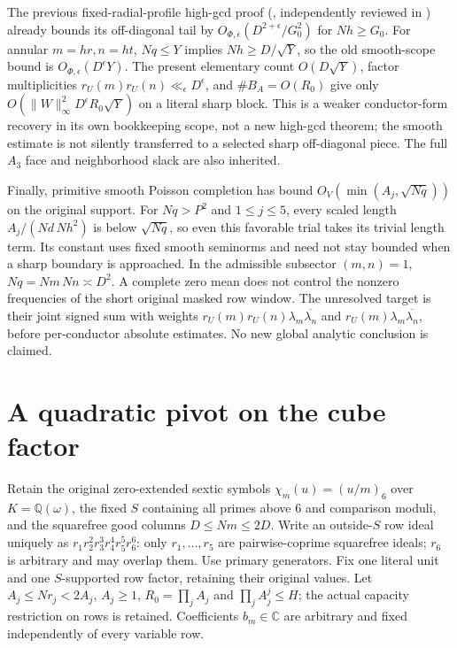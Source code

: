 \documentclass[11pt]{article}
\theoremstyle{definition}\newtheorem{definition}[theorem]{Definition}
\theoremstyle{remark}\newtheorem{remark}[theorem]{Remark}
\begin{document}
The previous fixed-radial-profile high-gcd proof
(, independently reviewed in
)
already bounds its off-diagonal tail by
$O_{\Phi,\epsilon}(D^{2+\epsilon}/G_0^2)$ for $Nh\ge G_0$.
For annular $m=hr,n=ht$, $Nq\le Y$ implies $Nh\ge D/\sqrt Y$,
so the old smooth-scope bound is $O_{\Phi,\epsilon}(D^\epsilon Y)$.
The present elementary count $O(D\sqrt Y)$, factor multiplicities
$r_U(m)r_U(n)\ll_\epsilon D^\epsilon$, and $\#B_A=O(R_0)$ give only
$O(\|W\|_\infty^2D^\epsilon R_0\sqrt Y)$ on a literal sharp block.
This is a weaker conductor-form recovery in its own bookkeeping scope,
not a new high-gcd theorem; the smooth estimate is not silently
transferred to a selected sharp off-diagonal piece.
The full $A_3$ face and neighborhood slack are also inherited.

Finally, primitive smooth Poisson completion has bound
$O_V(\min(A_j,\sqrt{Nq}))$ on the original support.
For $Nq>P^2$ and $1\le j\le5$, every scaled length
$A_j/(Nd\,Nh^2)$ is below $\sqrt{Nq}$, so even this favorable trial
takes its trivial length term. Its constant uses fixed smooth
seminorms and need not stay bounded when a sharp boundary is approached.
In the admissible subsector $(m,n)=1$, $Nq=Nm\,Nn\asymp D^2$.
A complete zero mean does not control the nonzero frequencies of the
short original masked row window. The unresolved target is their
joint signed sum with weights $r_U(m)r_U(n)\lambda_m\overline{\lambda_n}$
and $r_U(m)\lambda_m\overline{\lambda_n}$, before per-conductor absolute
estimates. No new global analytic conclusion is claimed.

\section{A quadratic pivot on the cube factor}\label{qp:core}
Retain the original zero-extended sextic symbols
$\chi_m(u)=(u/m)_6$ over $K=\mathbb Q(\omega)$, the fixed $S$ containing
all primes above $6$ and comparison moduli, and the squarefree good columns
$D\le Nm\le2D$. Write an outside-$S$ row ideal uniquely as
$r_1r_2^2r_3^3r_4^4r_5^5r_6^6$: only $r_1,\ldots,r_5$ are pairwise-coprime
squarefree ideals; $r_6$ is arbitrary and may overlap them. Use primary
generators. Fix one literal unit and one $S$-supported row factor, retaining
their original values. Let $A_j\le Nr_j<2A_j$, $A_j\ge1$,
$R_0=\prod_jA_j$ and $\prod_jA_j^j\le H$; the actual capacity restriction
on rows is retained. Coefficients $b_m\in\mathbb C$ are arbitrary and fixed
independently of every variable row.
\end{document}
